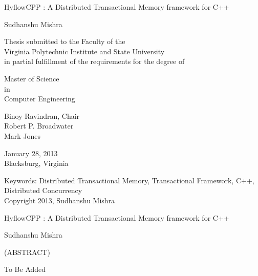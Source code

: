 \documentclass[12pt,english]{report}
\begin{document}
\thispagestyle{empty}
\begin{center}

{\Large 
HyflowCPP : A Distributed Transactional Memory framework for C++
}

\vfill

Sudhanshu Mishra

\vfill

Thesis submitted to the Faculty of the \\
Virginia Polytechnic Institute and State University \\
in partial fulfillment of the requirements for the degree of

\vfill

Master of Science \\
in \\
Computer Engineering


\vfill

Binoy Ravindran, Chair \\
Robert P. Broadwater \\
Mark Jones


\vfill

January 28, 2013 \\
Blacksburg, Virginia

\vfill

Keywords: Distributed Transactional Memory, Transactional Framework, C++, Distributed Concurrency
\\
Copyright 2013, Sudhanshu Mishra

\end{center}

\pagebreak

\thispagestyle{empty}
\begin{center}

{\large
HyflowCPP : A Distributed Transactional Memory framework for C++
}

\vfill

Sudhanshu Mishra

\vfill

(ABSTRACT)

\vfill

\end{center}

To Be Added




\vfill


\end{document}
